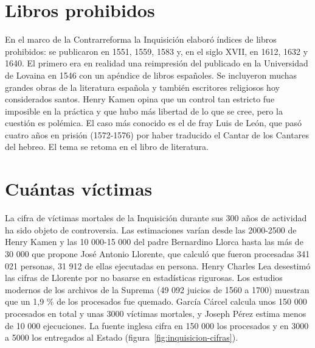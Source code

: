 \documentclass{book}
\begin{document}

\section{Libros prohibidos}

En el marco de la Contrarreforma la Inquisición elaboró índices de libros prohibidos: se publicaron en 1551, 1559, 1583 y, en el siglo XVII, en 1612, 1632 y 1640. El primero era en realidad una reimpresión del publicado en la Universidad de Lovaina en 1546 con un apéndice de libros españoles. Se incluyeron muchas grandes obras de la literatura española y también escritores religiosos hoy considerados santos. Henry Kamen opina que un control tan estricto fue imposible en la práctica y que hubo más libertad de lo que se cree, pero la cuestión es polémica. El caso más conocido es el de fray Luis de León, que pasó cuatro años en prisión (1572-1576) por haber traducido el Cantar de los Cantares del hebreo. El tema se retoma en el libro de literatura.


\section{Cuántas víctimas}

La cifra de víctimas mortales de la Inquisición durante sus 300 años de actividad ha sido objeto de controversia. Las estimaciones varían desde las 2000-2500 de Henry Kamen y las 10 000-15 000 del padre Bernardino Llorca hasta las más de 30 000 que propone José Antonio Llorente, que calculó que fueron procesadas 341 021 personas, 31 912 de ellas ejecutadas en persona. Henry Charles Lea desestimó las cifras de Llorente por no basarse en estadísticas rigurosas. Los estudios modernos de los archivos de la Suprema (49 092 juicios de 1560 a 1700) muestran que un 1,9 \% de los procesados fue quemado. García Cárcel calcula unos 150 000 procesados en total y unas 3000 víctimas mortales, y Joseph Pérez estima menos de 10 000 ejecuciones. La fuente inglesa cifra en 150 000 los procesados y en 3000 a 5000 los entregados al Estado (figura~\ref{fig:inquisicion-cifras}).

\end{document}
